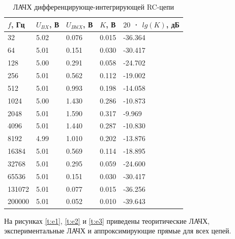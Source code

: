 \begin{table}[H]
	\begin{center}
	\caption{ЛАЧХ дифференцирующе-интегрирующей RC-цепи}
	\def\arraystretch{1.5}
		\begin{tabularx}{\textwidth}{|X|X|X|X|X|}
			\hline
			$f$, Гц & $U_{BX}$, В & $U_{BblX}$, В & $K$, В & $20$ · $lg(K)$, дБ\\\hline
			32 & 5.02 & 0.076 & 0.015 & -36.364\\\hline
			64 & 5.01 & 0.151 & 0.030 & -30.417\\\hline
			128 & 5.00 & 0.291 & 0.058 & -24.702\\\hline
			256 & 5.01 & 0.562 & 0.112 & -19.002\\\hline
			512 & 5.01 & 0.993 & 0.198 & -14.058\\\hline
			1024 & 5.00 & 1.430 & 0.286 & -10.873\\\hline
			2048 & 5.01 & 1.590 & 0.317 & -9.969\\\hline
			4096 & 5.01 & 1.440 & 0.287 & -10.830\\\hline
			8192 & 4.99 & 1.010 & 0.202 & -13.876\\\hline
			16384 & 5.01 & 0.569 & 0.114 & -18.895\\\hline
			32768 & 5.01 & 0.295 & 0.059 & -24.600\\\hline
			65536 & 5.01 & 0.151 & 0.030 & -30.417\\\hline
			131072 & 5.01 & 0.077 & 0.015 & -36.256\\\hline
			200000 & 5.01 & 0.052 & 0.010 & -39.643\\\hline		
		\end{tabularx}
		\label{tabular:3}
	\end{center}
\end{table}

На рисунках \ref{t:e1}, \ref{t:e2} и \ref{t:e3} приведены теоритические ЛАЧХ, экспериментальные ЛАЧХ и аппроксимирующие прямые для всех цепей.

